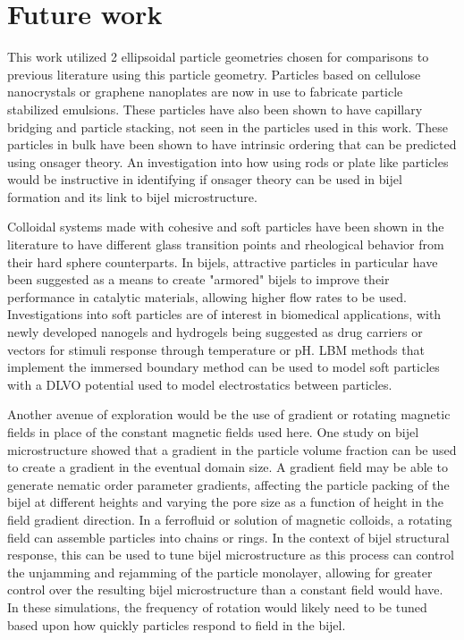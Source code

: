 \section{Future work}

This work utilized 2 ellipsoidal particle geometries chosen for comparisons to previous literature using this 
particle geometry. Particles based on cellulose nanocrystals or graphene nanoplates are now in use to fabricate
particle stabilized emulsions. These particles have also been shown to have capillary bridging and particle stacking,
not seen in the particles used in this work. These particles in bulk have been shown to have intrinsic ordering
that can be predicted using onsager theory. An investigation into how using rods or plate like particles would be 
instructive in identifying if onsager theory can be used in bijel formation and its link to bijel microstructure. 
\cite{tan_2d_2021}

Colloidal systems made with cohesive and soft particles have been shown in the literature to have different glass 
transition points and rheological behavior from their hard sphere counterparts. In bijels, attractive particles in 
particular have been suggested as a means to create "armored" bijels to improve their performance in catalytic materials, 
allowing higher flow rates to be used. Investigations into soft particles are of interest in biomedical
applications, with newly developed nanogels and hydrogels being suggested as drug carriers or vectors for stimuli 
response through temperature or pH. LBM methods that implement the immersed boundary method can be used to model soft
particles with a DLVO potential used to model electrostatics between particles. \cite{silva_lattice_2024}

Another avenue of exploration would be the use of gradient or rotating magnetic fields in place of the constant magnetic 
fields used here. One study on bijel microstructure showed that a gradient in the particle volume fraction can be used to 
create a gradient in the eventual domain size. A gradient field may be able to generate nematic order 
parameter gradients, affecting the particle packing of the bijel at different heights and varying the pore size as a function of 
height in the field gradient direction. In a ferrofluid or solution of magnetic colloids, a rotating field can assemble 
particles into chains or rings. In the context of bijel structural response, this can be used to tune bijel microstructure 
as this process can control the unjamming and rejamming of the particle monolayer, allowing for greater control over the 
resulting bijel microstructure than a constant field would have. In these simulations, the frequency of rotation would 
likely need to be tuned based upon how quickly particles respond to field in the bijel.


